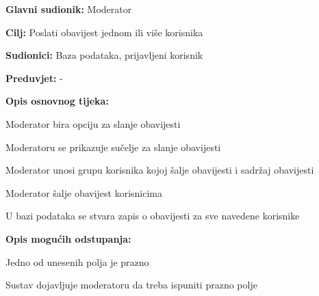 \noindent {}
\begin{packed_item}

\item \textbf{Glavni sudionik:} Moderator
\item  \textbf{Cilj:} Poslati obavijest jednom ili više korisnika
\item  \textbf{Sudionici:} Baza podataka, prijavljeni korisnik
\item  \textbf{Preduvjet:} -
\item  \textbf{Opis osnovnog tijeka:}

\item[] \begin{packed_enum}

    \item Moderator bira opciju za slanje obavijesti
    \item Moderatoru se prikazuje sučelje za slanje obavijesti
    \item Moderator unosi grupu korisnika kojoj šalje obavijesti i sadržaj obavijesti
    \item Moderator šalje obavijest korisnicima
    \item U bazi podataka se stvara zapis o obavijesti za sve navedene korisnike

\end{packed_enum}

\item  \textbf{Opis mogućih odstupanja:}

\item[] \begin{packed_item}

    \item[5.a] Jedno od unesenih polja je prazno
    \item[] \begin{packed_enum}

        \item Sustav dojavljuje moderatoru da treba ispuniti prazno polje

    \end{packed_enum}

\end{packed_item}
\end{packed_item}

